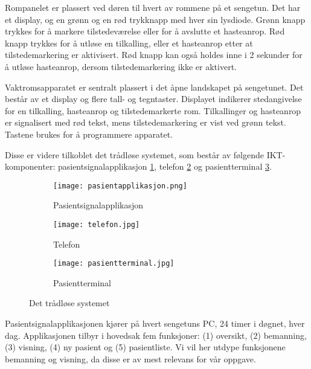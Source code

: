 \noindent
Rompanelet er plassert ved døren til hvert av rommene på et sengetun. Det har et display, og en grønn og en rød trykknapp med hver sin lysdiode. Grønn knapp trykkes for å markere tilstedeværelse eller for å avslutte et hasteanrop. Rød knapp trykkes for å utløse en tilkalling, eller et hasteanrop etter at tilstedemarkering er aktivisert. Rød knapp kan også holdes inne i 2 sekunder for å utløse hasteanrop, dersom tilstedemarkering ikke er aktivert. 

\noindent
Vaktromsapparatet er sentralt plassert i det åpne landskapet på sengetunet. Det består av et display og flere tall- og tegntaster. Displayet indikerer stedangivelse for en tilkalling, hasteanrop og tilstedemarkerte rom. Tilkallinger og hasteanrop er signalisert med rød tekst, mens tilstedemarkering er vist ved grønn tekst. Tastene brukes for å programmere apparatet.

\noindent
Disse er videre tilkoblet det trådløse systemet, som består av følgende IKT-komponenter: pasientsignalapplikasjon \ref{pasientapplikasjon}, telefon \ref{telefon} og pasientterminal \ref{pasientterminal}.

\begin{figure}[H]
        \centering
        \begin{subfigure}[b]{0.35\textwidth}
        		\centering
                \texttt{[image: pasientapplikasjon.png]}
                \caption{Pasientsignalapplikasjon}
                \label{pasientapplikasjon}
        \end{subfigure}%
        \begin{subfigure}[b]{0.25\textwidth}
        		\centering
                \texttt{[image: telefon.jpg]}
                \caption{Telefon}
                \label{telefon}
        \end{subfigure}
        \begin{subfigure}[b]{0.3\textwidth}
        		\centering
                \texttt{[image: pasientterminal.jpg]}
                \caption{Pasientterminal}
                \label{pasientterminal}
        \end{subfigure}
        \caption{Det trådløse systemet}\label{dettradlosesystemet}
\end{figure}
\noindent
Pasientsignalapplikasjonen kjører på hvert sengetuns PC, 24 timer i døgnet, hver dag. Applikasjonen tilbyr i hovedsak fem funksjoner: (1) oversikt, (2) bemanning, (3) visning, (4) ny pasient og (5) pasientliste. Vi vil her utdype funksjonene bemanning og visning, da disse er av mest relevans for vår oppgave.  

